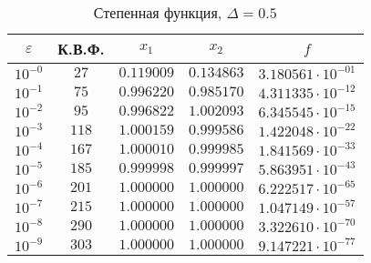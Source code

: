 \documentclass[a4paper,12pt,notitlepage,pdftex,headsepline]{scrartcl}
\begin{document}
        \begin{table}[ht]
          \centering
          \caption{Степенная функция, $\Delta = 0.5$}
          \begin{tabular}{|c|c|c|c|c|}
            \hline
            $\varepsilon$ & К.В.Ф. & $x_1$ & $x_2$ & $f$\\
            \hline
            $10^{-0}$ & $27$ & $0.119009$ & $0.134863$ & $3.180561\cdot 10^{-01}$\\
            $10^{-1}$ & $75$ & $0.996220$ & $0.985170$ & $4.311335\cdot 10^{-12}$\\
            $10^{-2}$ & $95$ & $0.996822$ & $1.002093$ & $6.345545\cdot 10^{-15}$\\
            $10^{-3}$ & $118$ & $1.000159$ & $0.999586$ & $1.422048\cdot 10^{-22}$\\
            $10^{-4}$ & $167$ & $1.000010$ & $0.999985$ & $1.841569\cdot 10^{-33}$\\
            $10^{-5}$ & $185$ & $0.999998$ & $0.999997$ & $5.863951\cdot 10^{-43}$\\
            $10^{-6}$ & $201$ & $1.000000$ & $1.000000$ & $6.222517\cdot 10^{-65}$\\
            $10^{-7}$ & $215$ & $1.000000$ & $1.000000$ & $1.047149\cdot 10^{-57}$\\
            $10^{-8}$ & $290$ & $1.000000$ & $1.000000$ & $3.322610\cdot 10^{-70}$\\
            $10^{-9}$ & $303$ & $1.000000$ & $1.000000$ & $9.147221\cdot 10^{-77}$\\
            \hline
          \end{tabular}
        \end{table}
\end{document}
